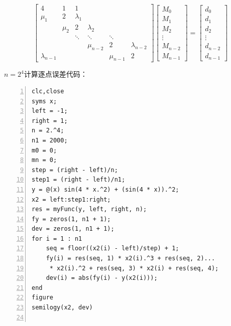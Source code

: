 \documentclass[12pt,a4paper,UTF8]{ctexart}
\begin{document}
\begin{enumerate}
	$$
		\left[\begin{array}{llllll}
			4   & 1 &  1      &        &    &    \\
	        \mu_1  & 2  & \lambda_1     &        &    &    \\
           		& \mu_2 & 2      & \lambda_2 &    &    \\
            	&    & \ddots & \ddots & \ddots &    \\
            	&    &        & \mu_{n-2}     & 2  & \lambda_{n-2} \\
            \lambda_{n-1}	&    &        &        & \mu_{n-1} & 2
		\end{array}\right]
		\left[\begin{array}{l}
			M_0\\
			M_1\\
			M_2\\
			\vdots \\
			M_{n-2} \\
			M_{n-1}
		\end{array}\right]=
		\left[\begin{array}{l}
			d_0\\
			d_1\\
			d_2\\
			\vdots \\
			d_{n-2} \\
			d_{n-1}
		\end{array}\right]
	$$

	$n=2^4$计算逐点误差代码：\\
\begin{lstlisting}[frame=single,numbers=left]
clc,close
syms x;
left = -1;
right = 1;
n = 2.^4;
n1 = 2000;
m0 = 0;
mn = 0;
step = (right - left)/n;
step1 = (right - left)/n1;
y = @(x) sin(4 * x.^2) + (sin(4 * x)).^2;
x2 = left:step1:right;
res = myFunc(y, left, right, n);
fy = zeros(1, n1 + 1);
dev = zeros(1, n1 + 1);
for i = 1 : n1
    seq = floor((x2(i) - left)/step) + 1;
    fy(i) = res(seq, 1) * x2(i).^3 + res(seq, 2)...
	 * x2(i).^2 + res(seq, 3) * x2(i) + res(seq, 4);
    dev(i) = abs(fy(i) - y(x2(i)));
end
figure
semilogy(x2, dev)


\end{lstlisting}
\end{enumerate}
\end{document}
